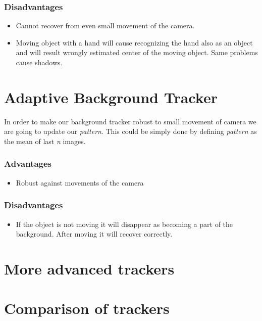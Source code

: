 \subsubsection{Disadvantages}
\begin{itemize}
\item Cannot recover from even small movement of the camera.
\item Moving object with a hand will cause recognizing the hand also as an object and will result wrongly estimated center of the moving object. Same problems cause shadows.
\end{itemize}


\section{Adaptive Background Tracker}

In order to make our background tracker robust to small movement of camera we
are going to update our \emph{pattern}. This could be simply done by defining \emph{pattern}
as the mean of last \emph{n} images.

\subsubsection{Advantages}
\begin{itemize}
\item Robust against movements of the camera
\end{itemize}

\subsubsection{Disadvantages}
\begin{itemize}
\item If the object is not moving it will disappear as becoming a part of the background. After moving it will recover correctly.
\end{itemize}


\section{More advanced trackers}


\section{Comparison of trackers}

